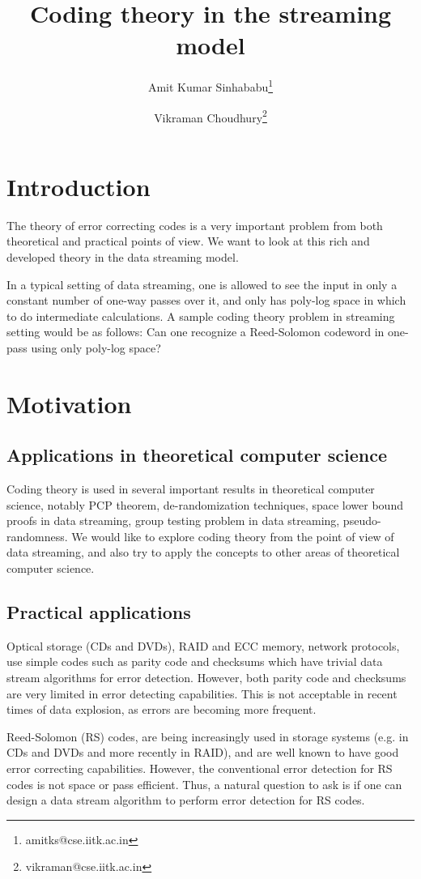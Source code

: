 \documentclass{article}
\title{\textbf{Coding theory in the streaming model}}
\author{Amit Kumar Sinhababu\thanks{amitks@cse.iitk.ac.in} }
\author{Vikraman Choudhury\thanks{vikraman@cse.iitk.ac.in} }
\affil{Department of Computer Science and Engineering,\\
  Indian Institute of Technology Kanpur
}
\begin{document}
\maketitle

\section{Introduction}
The theory of error correcting codes is a very important problem from both theoretical and practical points of view.
We want to look at this rich and developed theory in the data streaming model.

In a typical setting of data streaming, one is allowed to see the input in only a constant number
of one-way passes over it, and only has poly-log space in which to do intermediate calculations.
A sample coding theory problem in streaming setting would be as follows:
Can one recognize a Reed-Solomon codeword in one-pass using only poly-log space?

\section{Motivation}

\subsection{Applications in theoretical computer science}
Coding theory is used in several important results in theoretical computer science, notably
PCP theorem, de-randomization techniques, space lower bound proofs in data streaming, group testing problem in data streaming, pseudo-randomness.
We would like to explore coding theory from the point of view of data streaming, and also try to apply the concepts to other areas of theoretical computer science.

\subsection{Practical applications}

Optical storage (CDs and DVDs), RAID and ECC memory, network protocols, use simple codes
such as parity code and checksums which have trivial data stream algorithms for error detection.
However, both parity code and checksums are very limited in error detecting capabilities.
This is not acceptable in recent times of data explosion, as errors are becoming more frequent.

Reed-Solomon (RS) codes, are being increasingly used in storage systems (e.g. in
CDs and DVDs and more recently in RAID), and are well known to have good error
correcting capabilities. However, the conventional error detection for RS codes
is not space or pass efficient. Thus, a natural question to ask is if one can design
a data stream algorithm to perform error detection for RS codes.
\end{document}
